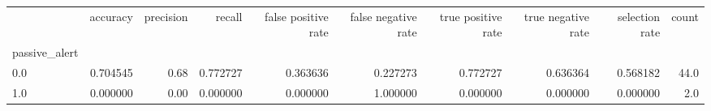 \begin{tabular}{lrrrrrrrrr}
\toprule
{} &  accuracy &  precision &    recall &  false positive rate &  false negative rate &  true positive rate &  true negative rate &  selection rate &  count \\
passive\_alert &           &            &           &                      &                      &                     &                     &                 &        \\
\midrule
0.0           &  0.704545 &       0.68 &  0.772727 &             0.363636 &             0.227273 &            0.772727 &            0.636364 &        0.568182 &   44.0 \\
1.0           &  0.000000 &       0.00 &  0.000000 &             0.000000 &             1.000000 &            0.000000 &            0.000000 &        0.000000 &    2.0 \\
\bottomrule
\end{tabular}

